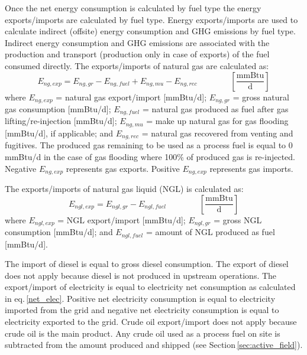 \documentclass[11pt]{report}
\newcommand{\eqnunitfrac}[2]{\quad\quad \scriptstyle{\left[\frac{\text{#1}}{\text{#2}}\right]}}
\begin{document}
Once the  net energy consumption is calculated by fuel type the energy exports/imports are calculated by fuel type. Energy exports/imports are used to calculate indirect (offsite) energy consumption and GHG emissions by fuel type. Indirect energy consumption and GHG emissions are associated with the production and transport (production only in case of exports) of the fuel consumed directly. The exports/imports of natural gas are calculated as: 
\begin{equation}
E_{ng,exp} = E_{ng,gr} - E_{ng,fuel} + E_{ng,mu} - E_{ng,rec} \quad\quad\eqnunitfrac{mmBtu}{d}
\end{equation}
where $E_{ng,exp}$ = natural gas export/import [mmBtu/d]; $E_{ng,gr}$ = gross natural gas consumption [mmBtu/d]; $E_{ng,fuel}$ = natural gas produced as fuel after gas lifting/re-injection [mmBtu/d]; $E_{ng,mu}$ = make up natural gas for gas flooding [mmBtu/d], if applicable; and $E_{ng,rec}$ = natural gas recovered from venting and fugitives. The produced gas remaining to be used as a process fuel is equal to 0 mmBtu/d in the case of gas flooding where 100\% of produced gas is re-injected. Negative $E_{ng,exp}$ represents gas exports. Positive $E_{ng,exp}$ represents gas imports.

The exports/imports of natural gas liquid (NGL) is calculated as:
\begin{equation}
E_{ngl,exp} = E_{ngl,gr} - E_{ngl,fuel} \quad\quad\eqnunitfrac{mmBtu}{d}
\end{equation}
where $E_{ngl,exp}$ = NGL export/import [mmBtu/d]; $E_{ngl,gr}$ = gross NGL consumption [mmBtu/d]; and $E_{ngl,fuel}$ = amount of NGL produced as fuel [mmBtu/d]. 

The import of diesel is equal to gross diesel consumption. The export of diesel does not apply because diesel is not produced in upstream operations. The export/import of electricity is equal to electricity net consumption as calculated in eq.\,\eqref{net_elec}. Positive net electricity consumption is equal to electricity imported from the grid and negative net electricity consumption is equal to electricity exported to the grid. Crude oil export/import does not apply because crude oil is the main product. Any crude oil used as a process fuel on site is subtracted from the amount produced and shipped (see Section\,\ref{sec:active_field}).
\end{document}
